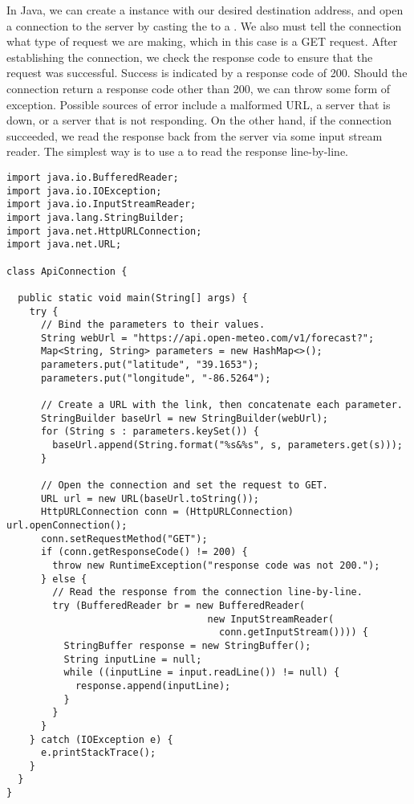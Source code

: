 In Java, we can create a  instance with our desired destination address, and open a connection to the server by casting the  to a . 
We also must tell the connection what type of request we are making, which in this case is a GET request. 
After establishing the connection, we check the response code to ensure that the request was successful. 
Success is indicated by a response code of 200. 
Should the connection return a response code other than 200, we can throw some form of exception. 
Possible sources of error include a malformed URL, a server that is down, or a server that is not responding.
On the other hand, if the connection succeeded, we read the response back from the server via some input stream reader. 
The simplest way is to use a  to read the response line-by-line.

\begin{lstlisting}[language=MyJava]
import java.io.BufferedReader;
import java.io.IOException;
import java.io.InputStreamReader;
import java.lang.StringBuilder;
import java.net.HttpURLConnection;
import java.net.URL;

class ApiConnection {

  public static void main(String[] args) {
    try {
      // Bind the parameters to their values.
      String webUrl = "https://api.open-meteo.com/v1/forecast?";
      Map<String, String> parameters = new HashMap<>();
      parameters.put("latitude", "39.1653");
      parameters.put("longitude", "-86.5264");

      // Create a URL with the link, then concatenate each parameter.
      StringBuilder baseUrl = new StringBuilder(webUrl);
      for (String s : parameters.keySet()) { 
        baseUrl.append(String.format("%s&%s", s, parameters.get(s))); 
      }
    
      // Open the connection and set the request to GET.
      URL url = new URL(baseUrl.toString());
      HttpURLConnection conn = (HttpURLConnection) url.openConnection();
      conn.setRequestMethod("GET");
      if (conn.getResponseCode() != 200) {
        throw new RuntimeException("response code was not 200.");
      } else {
        // Read the response from the connection line-by-line.
        try (BufferedReader br = new BufferedReader(
                                   new InputStreamReader(
                                     conn.getInputStream()))) {
          StringBuffer response = new StringBuffer();
          String inputLine = null;
          while ((inputLine = input.readLine()) != null) { 
            response.append(inputLine); 
          }
        }
      }
    } catch (IOException e) {
      e.printStackTrace();
    }
  }
}
\end{lstlisting}


